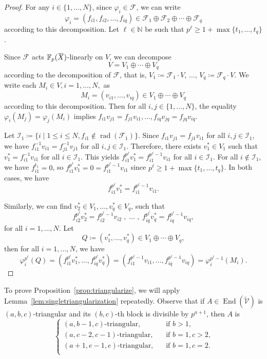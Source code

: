 \documentclass[letterpaper, 11pt, thm-restate]{article}
\numberwithin{equation}{section}
\newcommand{\N}{\mathbb{N}}
\newcommand{\F}{\mathbb{F}}
\newcommand{\End}{\operatorname{End}}
\newcommand{\rad}{\operatorname{rad}}
\newcommand{\mF}{\mathcal{F}}
\newcommand{\mI}{\mathcal{I}}
\newcommand{\tmV}{\widetilde{\mathcal{V}}}
\newcommand{\oX}{\mkern 1.5mu\overline{\mkern-1.5mu X \mkern-1.5mu}\mkern 1.5mu}
\theoremstyle{definition}
\theoremstyle{definition}
\theoremstyle{definition}
\begin{document}
\begin{proof}
    For any $i \in \{1, \ldots, N\}$, since $\varphi_i \in \mF$, we can write 
    \[
    \varphi_i = (f_{i1}, f_{i2}, \ldots, f_{iq}) \in \mF_1 \oplus \mF_2 \oplus \cdots \oplus \mF_q
    \]
    according to this decomposition.
    Let $\ell \in \N$ be such that $p^{\ell} \geq 1+\max\{t_1, \ldots, t_q\}$.

    Since $\mF$ acts $\F_p(\oX)$-linearly on $V$, we can decompose 
    \[
    V = V_1 \oplus \cdots \oplus V_q
    \]
    according to the decomposition of $\mF$, that is, $V_1 \coloneqq \mF_1 \cdot V$, $\ldots$, $V_q \coloneqq \mF_q \cdot V$.
    We write each $M_i \in V, i = 1, \ldots, N,$ as 
    \[
    M_i = (v_{i1}, \ldots, v_{iq}) \in V_1 \oplus \cdots \oplus V_q
    \]
    according to this decomposition.
    Then for all $i, j \in \{1, \ldots, N\}$, the equality $\varphi_i(M_j) = \varphi_j(M_i)$ implies 
    $f_{i1}v_{j1} = f_{j1}v_{i1}, \ldots, f_{iq}v_{jq} = f_{jq}v_{iq}$.

    Let $\mI_1 \coloneqq \{i \mid 1 \leq i \leq N, f_{i1} \notin \rad(\mF_1)\}$.
    Since $f_{i1}v_{j1} = f_{j1}v_{i1}$ for all $i, j \in \mI_1$, we have $f_{i1}^{-1}v_{i1} = f_{j1}^{-1}v_{j1}$ for all $i, j \in \mI_1$.
    Therefore, there exists $v_1^* \in V_1$ such that $v_{1}^* = f_{i1}^{-1}v_{i1}$ for all $i \in \mI_1$.
    This yields $f_{i1}^{p^{\ell}}v_1^* = f_{i1}^{p^{\ell}-1}v_{i1}$ for all $i \in \mI_1$.
    For all $i \notin \mI_1$, we have $f_{i1}^{t_1} = 0$, so $f_{i1}^{p^{\ell}}v_1^* = 0 = f_{i1}^{p^{\ell}-1}v_{i1}$ since $p^{\ell} \geq 1+\max\{t_1, \ldots, t_q\}$.
    In both cases, we have
    \[
    f_{i1}^{p^{\ell}}v_1^* = f_{i1}^{p^{\ell}-1}v_{i1}.
    \]

    Similarly, we can find $v_2^* \in V_1, \ldots, v_q^* \in V_q$, such that
    \[
    f_{i2}^{p^{\ell}}v_2^* = f_{i2}^{p^{\ell}-1}v_{i2} \;, \;  \ldots \;, \; f_{iq}^{p^{\ell}}v_q^* = f_{iq}^{p^{\ell}-1}v_{iq},
    \]
    for all $i = 1, \ldots, N$.
    Let 
    \[
    Q \coloneqq (v_1^*, \ldots, v_q^*) \in V_1 \oplus \cdots \oplus V_q,
    \]
    then for all $i = 1, \ldots, N$, we have
    \[
    \varphi_i^{p^{\ell}}(Q) = (f_{i1}^{p^{\ell}} v_1^*, \ldots, f_{iq}^{p^{\ell}} v_q^*) = (f_{i1}^{p^{\ell}-1} v_{i1}, \ldots, f_{iq}^{p^{\ell}-1} v_{iq}) = \varphi_i^{p^{\ell}-1}(M_i).
    \]
\end{proof}

To prove Proposition~\ref{prop:triangularize}, we will apply Lemma~\ref{lem:singletriangularization} repeatedly.
Observe that if $A \in \End(\tmV)$ is $(a, b, c)$-triangular and its $(b,c)$-th block is divisible by $p^{a+1}$, then $A$ is
\[
\begin{cases}
    \text{$(a, b-1, c)$-triangular,} \quad & \text{if $b > 1$,} \\
    \text{$(a, c-2, c-1)$-triangular,} \quad & \text{if $b = 1, c > 2$,} \\
    \text{$(a+1, e-1, e)$-triangular,} \quad & \text{if $b = 1, c = 2$.} \\
\end{cases}
\]
\end{document}

